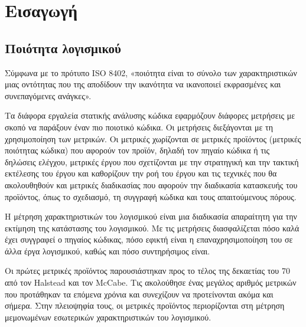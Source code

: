 \section{Εισαγωγή}

\subsection{Ποιότητα λογισμικού}

Σύμφωνα με το πρότυπο ISO 8402, «ποιότητα είναι το σύνολο των χαρακτηριστικών μιας οντότητας που της αποδίδουν την ικανότητα να ικανοποιεί εκφρασμένες και συνεπαγόμενες ανάγκες».

Τα διάφορα εργαλεία στατικής ανάλυσης κώδικα εφαρμόζουν διάφορες μετρήσεις με σκοπό να παράξουν έναν πιο ποιοτικό κώδικα. Οι μετρήσεις διεξάγονται με τη χρησιμοποίηση των μετρικών. Οι μετρικές χωρίζονται σε μετρικές προϊόντος (μετρικές ποιότητας κώδικα) που αφορούν τον προϊόν, δηλαδή τον πηγαίο κώδικα ή τις δηλώσεις ελέγχου, μετρικές έργου που σχετίζονται με την στρατηγική και την τακτική εκτέλεσης του έργου και καθορίζουν την ροή του έργου και τις τεχνικές που θα ακολουθηθούν και μετρικές διαδικασίας που αφορούν την διαδικασία κατασκευής του προϊόντος, όπως το σχεδιασμό, τη συγγραφή κώδικα και τους απαιτούμενους πόρους.

Η μέτρηση χαρακτηριστικών του λογισμικού είναι μια διαδικασία απαραίτητη για την εκτίμηση της κατάστασης του λογισμικού. Με τις μετρήσεις διασφαλίζεται πόσο καλά έχει συγγραφεί ο πηγαίος κώδικας, πόσο εφικτή είναι η επαναχρησιμοποίηση του σε άλλα έργα λογισμικού, καθώς και πόσο συντηρήσιμος είναι.

Οι πρώτες μετρικές προϊόντος παρουσιάστηκαν προς το τέλος της δεκαετίας του 70 από τον Halstead και τον McCabe. Τις ακολούθησε ένας μεγάλος αριθμός μετρικών που προτάθηκαν τα επόμενα χρόνια και συνεχίζουν να προτείνονται ακόμα και σήμερα. Στην πλειοψηφία τους, οι μετρικές προϊόντος περιορίζονται στη μέτρηση μεμονωμένων εσωτερικών χαρακτηριστικών του λογισμικού.

